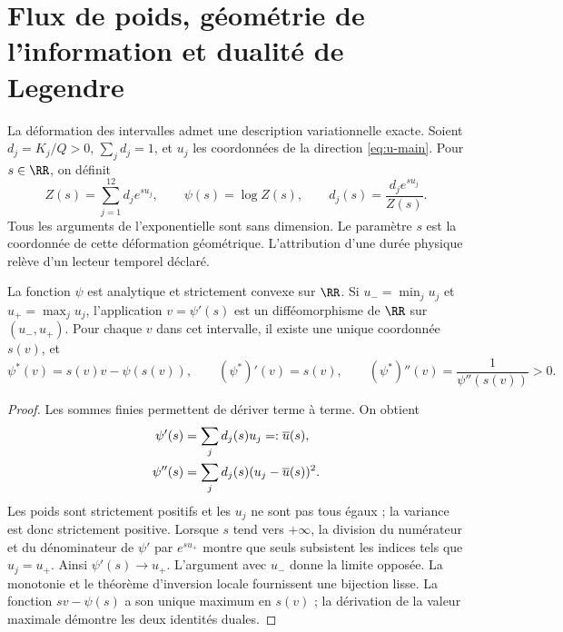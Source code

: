 \section{Flux de poids, géométrie de l'information et dualité de Legendre}
\label{sec:convex-refinement}

La déformation des intervalles admet une description variationnelle
exacte. Soient \(d_j=K_j/Q>0\), \(\sum_jd_j=1\), et \(u_j\) les
coordonnées de la direction \eqref{eq:u-main}. Pour \(s\in\RR\),
on définit
\begin{equation}
 Z(s)=\sum_{j=1}^{12}d_j e^{su_j},\qquad
 \psi(s)=\log Z(s),\qquad
 d_j(s)=\frac{d_j e^{su_j}}{Z(s)}.
 \label{eq:convex-partition}
\end{equation}
Tous les arguments de l'exponentielle sont sans dimension. Le paramètre \(s\) est la coordonnée de cette déformation géométrique. L'attribution d'une durée physique relève d'un lecteur temporel déclaré.

\begin{theorem}
La fonction \(\psi\) est analytique et strictement convexe sur \(\RR\).
Si \(u_- =\min_j u_j\) et \(u_+=\max_j u_j\), l’application
\(v=\psi'(s)\) est un difféomorphisme de \(\RR\) sur \((u_-,u_+)\).
Pour chaque \(v\) dans cet intervalle, il existe une unique coordonnée \(s(v)\), et
\[
 \psi^*(v)=s(v)v-\psi(s(v)),\qquad
 (\psi^*)'(v)=s(v),\qquad
 (\psi^*)''(v)=\frac1{\psi''(s(v))}>0.
\]
\end{theorem}
\begin{proof}
Les sommes finies permettent de dériver terme à terme. On obtient
\begin{align}
 \psi'(s)&=\sum_jd_j(s)u_j=:\overline u(s),\notag\\
 \psi''(s)&=\sum_jd_j(s)(u_j-\overline u(s))^2.
 \label{eq:variance}
\end{align}
Les poids sont strictement positifs et les \(u_j\) ne sont pas tous égaux ; la variance est donc strictement positive. Lorsque \(s\) tend vers \(+\infty\), la division du numérateur et du dénominateur de \(\psi'\) par \(e^{su_+}\) montre que seuls subsistent les indices tels que \(u_j=u_+\). Ainsi \(\psi'(s)\to u_+\). L'argument avec \(u_-\) donne la limite opposée. La monotonie et le théorème d'inversion locale fournissent une bijection lisse. La fonction \(sv-\psi(s)\) a son unique maximum en \(s(v)\) ; la dérivation de la valeur maximale démontre les deux identités duales.
\end{proof}

